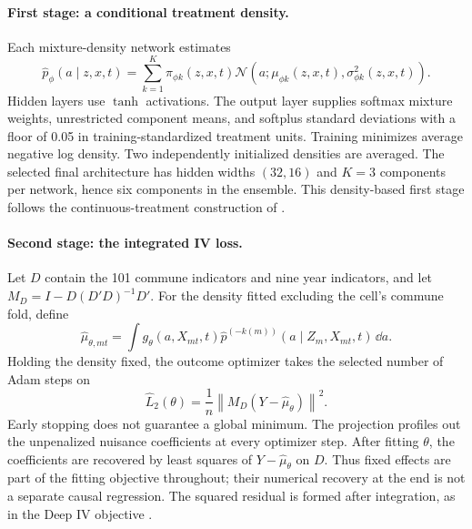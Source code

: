 \paragraph{First stage: a conditional treatment density.}
Each mixture-density network estimates
\begin{equation}
\widehat p_\phi(a\mid z,x,t)
=\sum_{k=1}^{K}\pi_{\phi k}(z,x,t)
\mathcal N\!\left(a;\mu_{\phi k}(z,x,t),\sigma_{\phi k}^2(z,x,t)\right).
\label{eq:neural-density}
\end{equation}
Hidden layers use $\tanh$ activations. The output layer supplies softmax mixture weights, unrestricted component means, and softplus standard deviations with a floor of 0.05 in training-standardized treatment units. Training minimizes average negative log density. Two independently initialized densities are averaged. The selected final architecture has hidden widths $(32,16)$ and $K=3$ components per network, hence six components in the ensemble. This density-based first stage follows the continuous-treatment construction of \cite[Section 3]{deepiv}.

\paragraph{Second stage: the integrated IV loss.}
Let $D$ contain the 101 commune indicators and nine year indicators, and let $M_D=I-D(D'D)^{-1}D'$. For the density fitted excluding the cell's commune fold, define
\begin{equation}
\widehat\mu_{\theta,mt}
=\int g_\theta(a,X_{mt},t)\widehat p^{(-k(m))}(a\mid Z_m,X_{mt},t)\,\dd a.
\end{equation}
Holding the density fixed, the outcome optimizer takes the selected number of Adam steps on
\begin{equation}
\widehat L_2(\theta)=\frac1n
\left\|M_D(Y-\widehat\mu_\theta)\right\|^2.
\label{eq:neural-loss}
\end{equation}
Early stopping does not guarantee a global minimum. The projection profiles out the unpenalized nuisance coefficients at every optimizer step. After fitting $\theta$, the coefficients are recovered by least squares of $Y-\widehat\mu_\theta$ on $D$. Thus fixed effects are part of the fitting objective throughout; their numerical recovery at the end is not a separate causal regression. The squared residual is formed after integration, as in the Deep IV objective \cite[eqs. (6)--(7)]{deepiv}.

